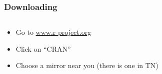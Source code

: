 \documentclass[color=usenames,dvipsnames]{beamer}\usepackage[]{graphicx}\usepackage[]{color}
\begin{document}
\begin{frame}
  \frametitle{Downloading \R}
  \begin{columns}
    \begin{column}{0.4\textwidth}
      \small
      \begin{itemize}
      \item Go to \url{www.r-project.org}
      \item Click on ``CRAN''
      \item Choose a mirror near you (there is one in TN)
      \end{itemize}
    \end{column}
    \begin{column}{0.6\textwidth}
       \par
    \end{column}
  \end{columns}
\end{frame}
\end{document}
